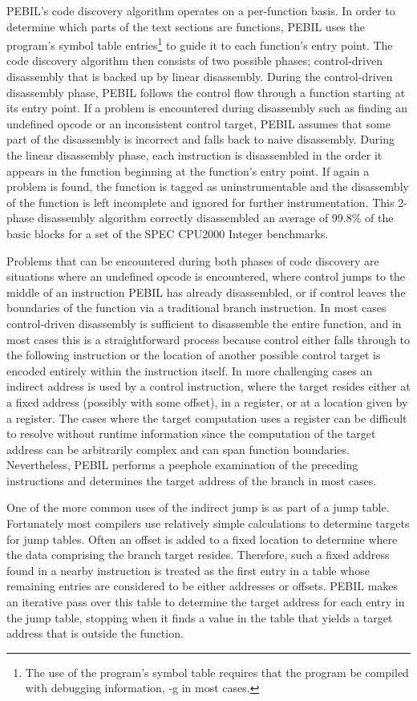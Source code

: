 PEBIL's code discovery algorithm operates on a per-function basis. In order to
determine which parts of the text sections are functions, PEBIL uses the
program's symbol table entries\footnote{The use of the program's symbol table
requires that the program be compiled with debugging information, -g in most
cases.} to guide it to each function's entry point. The code discovery algorithm
then consists of two possible phases; control-driven disassembly that is backed
up by linear disassembly. During the control-driven disassembly phase, PEBIL
follows the control flow through a function starting at its entry point. If a
problem is encountered during disassembly such as finding an undefined opcode or
an inconsistent control target, PEBIL assumes that some part of the disassembly
is incorrect and falls back to naive disassembly. During the linear disassembly
phase, each instruction is disassembled in the order it appears in the function
beginning at the function's entry point. If again a problem is found, the
function is tagged as uninstrumentable and the disassembly of the function is
left incomplete and ignored for further instrumentation. This 2-phase
disassembly algorithm correctly disassembled an average of 99.8\% of the basic
blocks for a set of the SPEC CPU2000 Integer benchmarks.

Problems that can be encountered during both phases of code discovery are
situations where an undefined opcode is encountered, where control jumps to the
middle of an instruction PEBIL has already disassembled, or if control leaves
the boundaries of the function via a traditional branch instruction. In most
cases control-driven disassembly is sufficient to disassemble the entire
function, and in most cases this is a straightforward
process because control either falls through to the following instruction or the
location of another possible control target is encoded entirely within the
instruction itself. In more challenging cases an indirect address is used
by a control instruction, where the target resides either at a fixed address
(possibly with some offset), in a register, or at a location given by a
register. The cases where the target computation uses a register 
can be difficult to resolve without runtime
information since the computation of the target address can be arbitrarily
complex and can span function boundaries. Nevertheless, PEBIL performs a
peephole examination of the preceding instructions and determines the target
address of the branch in most cases.

One of the more common uses of the indirect jump is as part of a jump table.
Fortunately most compilers use relatively simple calculations to determine
targets for jump tables. Often an offset is added to a fixed location to
determine where the data comprising the branch target resides. Therefore, such a
fixed address found in a nearby instruction is treated as the first entry in a
table whose remaining entries are considered to be either addresses or offsets.
PEBIL makes an iterative pass over this table to determine the target address
for each entry in the jump table, stopping when it finds a value in the table
that yields a target address that is outside the function.

